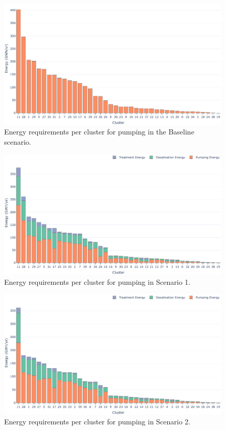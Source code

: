 \documentclass[12pt]{iopart}
\begin{document}
\begin{figure}[!h]
	\centering
	\includegraphics[width=\textwidth]{BaselineEnergy}
	\caption{Energy requirements per cluster for pumping in the Baseline scenario.}
	\label{fig:BaselineEnergy}
\end{figure}

\begin{figure}[!h]
	\centering
	\includegraphics[width=\textwidth]{Scenario1Energy}
	\caption{Energy requirements per cluster for pumping in Scenario 1.}
	\label{fig:Scenario1Energy}
\end{figure}

\begin{figure}[!h]
	\centering
	\includegraphics[width=\textwidth]{Scenario2Energy}
	\caption{Energy requirements per cluster for pumping in Scenario 2.}
	\label{fig:Scenario2Energy}
\end{figure}
\end{document}
